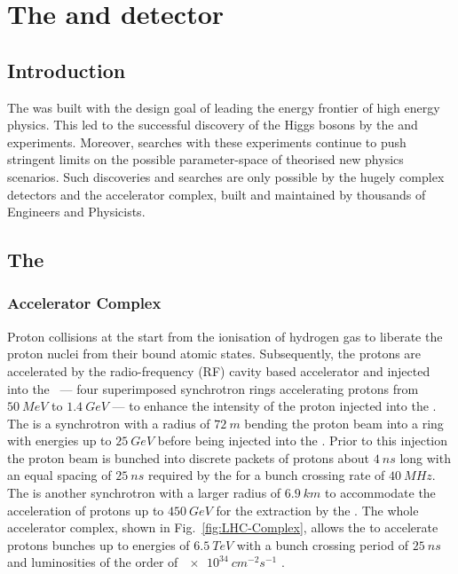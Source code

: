 \chapter{The \LHC and \CMS detector} \label{chap:detector}


\section{Introduction}

The \LHC was built with the design goal of leading the energy frontier of high energy physics. This led to the successful discovery of the Higgs bosons by the \ATLAS \cite{Aad:1471031} and \CMS \cite{Chatrchyan:1471016} experiments.  Moreover, \BSM searches with these experiments continue to push stringent limits on the possible parameter-space of theorised new physics scenarios.  Such discoveries and searches are only possible by the hugely complex detectors and the \LHC accelerator complex, built and maintained by thousands of Engineers and Physicists.

\section{The \LHC}

\subsection{Accelerator Complex}

Proton collisions at the \LHC start from the ionisation of hydrogen gas to liberate the proton nuclei from their bound atomic states. Subsequently, the protons are accelerated by the radio-frequency (RF) cavity based accelerator \LINACTWO and injected into the \PSBooster\ --- four superimposed synchrotron rings accelerating protons from ${\SI{50}{MeV}}$ to ${\SI{1.4}{GeV}}$ --- to enhance the intensity of the proton injected into the \PS. The \PS is a synchrotron with a radius of ${\SI{72}{m}}$ bending the proton beam into a ring with energies up to ${\SI{25}{GeV}}$ before being injected into the \SPS.  Prior to this injection the proton beam is bunched into discrete packets of protons about ${\SI{4}{ns}}$ long with an equal spacing of ${\SI{25}{ns}}$ required by the \LHC for a bunch crossing rate of ${\SI{40}{MHz}}$. The \SPS is another synchrotron with a larger radius of ${\SI{6.9}{km}}$ to accommodate the acceleration of protons up to ${\SI{450}{GeV}}$ for the extraction by the \LHC. The whole accelerator complex, shown in Fig.~\ref{fig:LHC-Complex}, allows the \LHC to accelerate protons bunches up to energies of ${\SI{6.5}{TeV}}$ with a bunch crossing period of ${\SI{25}{ns}}$ and luminosities of the order of ${\SI{e34}{cm^{-2}s^{-1}}}$ \cite{Bruning:782076}.

